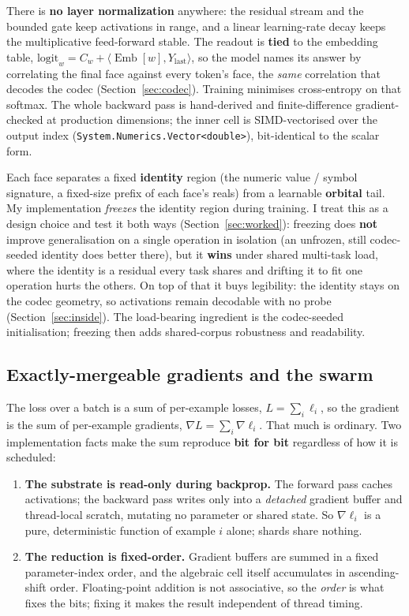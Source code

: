\documentclass[11pt]{article}
\newcommand{\Emb}{\operatorname{Emb}}
\newcommand{\code}[1]{\texttt{#1}}
\begin{document}
There is \textbf{no layer normalization} anywhere: the residual stream and the bounded gate keep
activations in range, and a linear learning-rate decay keeps the multiplicative feed-forward stable. The
readout is \textbf{tied} to the embedding table,
$\mathrm{logit}_w = C_w + \langle \Emb[w], Y_{\text{last}}\rangle$, so the model names its answer by
correlating the final face against every token's face, the \emph{same} correlation that decodes the
codec (Section~\ref{sec:codec}). Training minimises cross-entropy on that softmax. The whole backward
pass is hand-derived and finite-difference gradient-checked at production dimensions; the inner cell is
SIMD-vectorised over the output index (\code{System.Numerics.Vector<double>}), bit-identical to the
scalar form.

Each face separates a fixed \textbf{identity} region (the numeric value / symbol signature, a fixed-size
prefix of each face's reals) from a learnable \textbf{orbital} tail. My implementation \emph{freezes}
the identity region during training. I treat this as a design choice and test it both ways
(Section~\ref{sec:worked}): freezing does \textbf{not} improve generalisation on a single operation in
isolation (an unfrozen, still codec-seeded identity does better there), but it \textbf{wins} under
shared multi-task load, where the identity is a residual every task shares and drifting it to fit one
operation hurts the others. On top of that it buys legibility: the identity stays on the codec geometry,
so activations remain decodable with no probe (Section~\ref{sec:inside}). The load-bearing ingredient is
the codec-seeded initialisation; freezing then adds shared-corpus robustness and readability.

\subsection{Exactly-mergeable gradients and the swarm}\label{sec:merge}

The loss over a batch is a sum of per-example losses, $L = \sum_i \ell_i$, so the gradient is the sum of
per-example gradients, $\nabla L = \sum_i \nabla \ell_i$. That much is ordinary. Two implementation
facts make the sum reproduce \textbf{bit for bit} regardless of how it is scheduled:
\begin{enumerate}
\item \textbf{The substrate is read-only during backprop.} The forward pass caches activations; the
backward pass writes only into a \emph{detached} gradient buffer and thread-local scratch, mutating no
parameter or shared state. So $\nabla \ell_i$ is a pure, deterministic function of example $i$ alone;
shards share nothing.
\item \textbf{The reduction is fixed-order.} Gradient buffers are summed in a fixed parameter-index
order, and the algebraic cell itself accumulates in ascending-shift order. Floating-point addition is
not associative, so the \emph{order} is what fixes the bits; fixing it makes the result independent of
thread timing.
\end{enumerate}
\end{document}
